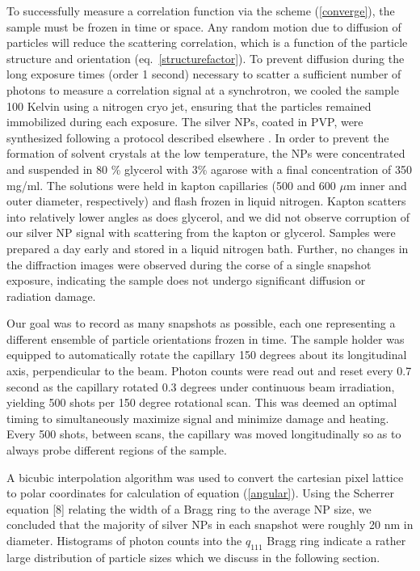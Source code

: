 \documentclass [11pt,fleqn]{article}
\begin{document}
To successfully measure a correlation function via the scheme (\ref{converge}), the sample must be frozen in time or space. Any random motion due to diffusion of particles will reduce the scattering correlation, which is a function of the particle structure and orientation (eq.~\ref{structurefactor}). To prevent diffusion during the long exposure times (order 1 second) necessary to scatter a sufficient number of photons to measure a correlation signal at a synchrotron, we cooled the sample 100 Kelvin using a nitrogen cryo jet, ensuring that the particles remained immobilized during each exposure. The silver NPs, coated in PVP, were synthesized following a protocol described elsewhere \cite{Levard:2011bx}. In order to prevent the formation of solvent crystals at the low temperature, the NPs were concentrated and suspended in 80 \% glycerol with 3\% agarose with a final concentration of 350 mg/ml. The solutions were held in kapton capillaries (500 and 600 $\mu$m inner and outer diameter, respectively) and flash frozen in liquid nitrogen. Kapton scatters into relatively lower angles as does glycerol, and we did not observe corruption of our silver NP signal with scattering from the kapton or glycerol. Samples were prepared a day early and stored in a liquid nitrogen bath. Further, no changes in the diffraction images were observed during the corse of a single snapshot exposure, indicating the sample does not undergo significant diffusion or radiation damage.

Our goal was to record as many snapshots as possible, each one representing a different ensemble of particle orientations frozen in time. The sample holder was equipped to automatically rotate the capillary 150 degrees about its longitudinal axis, perpendicular to the beam. Photon counts were read out and reset every 0.7 second as the capillary rotated 0.3 degrees under continuous beam irradiation, yielding 500 shots per 150 degree rotational scan. This was deemed an optimal timing to simultaneously maximize signal and minimize damage and heating. Every 500 shots, between scans, the capillary was moved longitudinally so as to always probe different regions of the sample.

A bicubic interpolation algorithm was used to convert the cartesian pixel lattice to polar coordinates for calculation of equation (\ref{angular}). Using the Scherrer equation [8] relating the width of a Bragg ring to the average NP size, we concluded that the majority of silver NPs in each snapshot were roughly 20 nm in diameter. Histograms of photon counts into the $q_{111}$ Bragg ring indicate a rather large distribution of particle sizes which we discuss in the following section.
\end{document}
